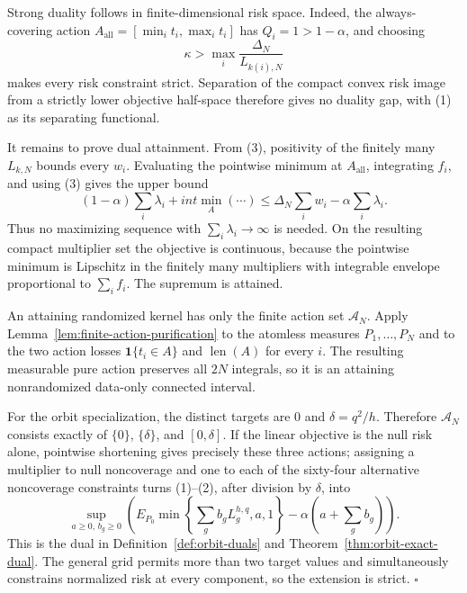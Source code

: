 Strong duality follows in finite-dimensional risk space.  Indeed, the always-covering action
\(A_{\mathrm{all}}=[\min_i t_i,\max_i t_i]\) has \(Q_i=1>1-\alpha\), and choosing
\[
 \kappa>\max_i\frac{\Delta_N}{L_{k(i),N}}
\]
makes every risk constraint strict.  Separation of the compact convex risk image from a strictly lower objective half-space therefore gives no duality gap, with (1) as its separating functional.

It remains to prove dual attainment.  From (3), positivity of the finitely many \(L_{k,N}\) bounds every \(w_i\).  Evaluating the pointwise minimum at \(A_{\mathrm{all}}\), integrating \(f_i\), and using (3) gives the upper bound
\[
 (1-\alpha)\sum_i\lambda_i+int\min_A(\cdots)
 \leq \Delta_N\sum_iw_i-\alpha\sum_i\lambda_i.
\tag{4}
\]
Thus no maximizing sequence with \(\sum_i\lambda_i\to\infty\) is needed.  On the resulting compact multiplier set the objective is continuous, because the pointwise minimum is Lipschitz in the finitely many multipliers with integrable envelope proportional to \(\sum_i f_i\).  The supremum is attained.

An attaining randomized kernel has only the finite action set \(\mathcal A_N\).  Apply Lemma~\ref{lem:finite-action-purification} to the atomless measures \(P_1,\ldots,P_N\) and to the two action losses \(\mathbf1\{t_i\in A\}\) and \(\operatorname{len}(A)\) for every \(i\).  The resulting measurable pure action preserves all \(2N\) integrals, so it is an attaining nonrandomized data-only connected interval.

For the orbit specialization, the distinct targets are \(0\) and \(\delta=q^2/h\).  Therefore \(\mathcal A_N\) consists exactly of \(\{0\}\), \(\{\delta\}\), and \([0,\delta]\).  If the linear objective is the null risk alone, pointwise shortening gives precisely these three actions; assigning a multiplier to null noncoverage and one to each of the sixty-four alternative noncoverage constraints turns (1)--(2), after division by \(\delta\), into
\[
 \sup_{a\geq0,\,b_g\geq0}
 \left(E_{P_0}\min\left\{\sum_gb_gL_g^{h,q},a,1\right\}
 -\alpha\left(a+\sum_gb_g\right)\right).
\]
This is the dual in Definition~\ref{def:orbit-duals} and Theorem~\ref{thm:orbit-exact-dual}.  The general grid permits more than two target values and simultaneously constrains normalized risk at every component, so the extension is strict. \(\square\)